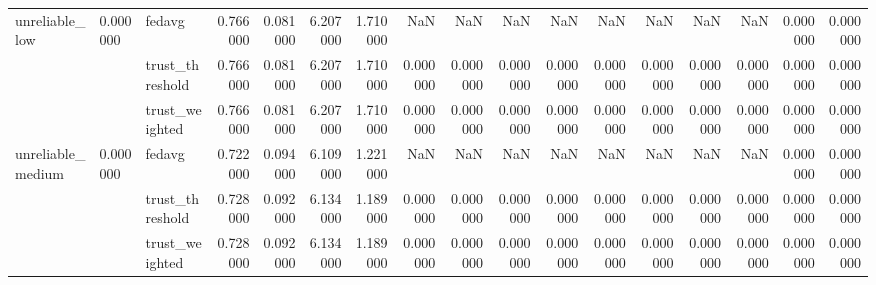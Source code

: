 \begin{tabular}{lllrrrrrrrrrrrrrr}
\cline{1-17} \cline{2-17}
\multirow[t]{3}{*}{unreliable_low} & \multirow[t]{3}{*}{0.000000} & fedavg & 0.766000 & 0.081000 & 6.207000 & 1.710000 & NaN & NaN & NaN & NaN & NaN & NaN & NaN & NaN & 0.000000 & 0.000000 \\
 &  & trust_threshold & 0.766000 & 0.081000 & 6.207000 & 1.710000 & 0.000000 & 0.000000 & 0.000000 & 0.000000 & 0.000000 & 0.000000 & 0.000000 & 0.000000 & 0.000000 & 0.000000 \\
 &  & trust_weighted & 0.766000 & 0.081000 & 6.207000 & 1.710000 & 0.000000 & 0.000000 & 0.000000 & 0.000000 & 0.000000 & 0.000000 & 0.000000 & 0.000000 & 0.000000 & 0.000000 \\
\cline{1-17} \cline{2-17}
\multirow[t]{3}{*}{unreliable_medium} & \multirow[t]{3}{*}{0.000000} & fedavg & 0.722000 & 0.094000 & 6.109000 & 1.221000 & NaN & NaN & NaN & NaN & NaN & NaN & NaN & NaN & 0.000000 & 0.000000 \\
 &  & trust_threshold & 0.728000 & 0.092000 & 6.134000 & 1.189000 & 0.000000 & 0.000000 & 0.000000 & 0.000000 & 0.000000 & 0.000000 & 0.000000 & 0.000000 & 0.000000 & 0.000000 \\
 &  & trust_weighted & 0.728000 & 0.092000 & 6.134000 & 1.189000 & 0.000000 & 0.000000 & 0.000000 & 0.000000 & 0.000000 & 0.000000 & 0.000000 & 0.000000 & 0.000000 & 0.000000 \\
\cline{1-17} \cline{2-17}
\bottomrule
\end{tabular}
